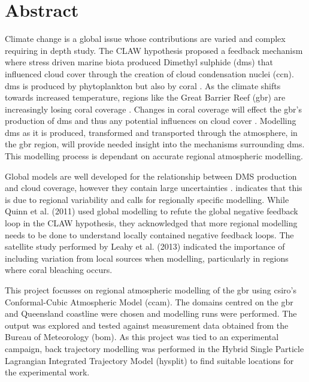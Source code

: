 


\chapter*{Abstract}
\label{ch:abst}

Climate change is a global issue whose contributions are varied and complex requiring in depth study. The CLAW hypothesis \citep{charlson:1987fw} proposed a feedback mechanism where stress driven marine biota produced Dimethyl sulphide (\gls{dms}) that influenced cloud cover through the creation of cloud condensation nuclei (\gls{ccn}). \gls{dms} is produced by phytoplankton but also by coral \citep{raina:2013fj}. As the climate shifts towards increased temperature, regions like the Great Barrier Reef (\gls{gbr}) are increasingly losing coral coverage \citep{hoeghguldberg:1999bi}. Changes in coral coverage will effect the \gls{gbr}'s production of \gls{dms} and thus any potential influences on cloud cover \citep{fischer2012atmospheric}. Modelling \gls{dms} as it is produced, transformed and transported through the atmosphere, in the \gls{gbr} region, will provide needed insight into the mechanisms surrounding \gls{dms}. This modelling process is dependant on accurate regional atmospheric modelling.

Global models are well developed for the relationship between DMS production and cloud coverage, however they contain large uncertainties \citep{woodhouse:2010ed}. \citep{cainey:2007jj} indicates that this is due to regional variability and calls for regionally specific modelling. While Quinn et al. (2011) used global modelling to refute the global negative feedback loop in the CLAW hypothesis, they acknowledged that more regional modelling needs to be done to understand locally contained negative feedback loops. The satellite study performed by Leahy et al. (2013) indicated the importance of including variation from local sources when modelling, particularly in regions where coral bleaching occurs.

This project focusses on regional atmospheric modelling of the \gls{gbr} using \gls{csiro}'s Conformal-Cubic Atmospheric Model (\gls{ccam}). The domains centred on the \gls{gbr} and Queensland coastline were chosen and modelling runs were performed. The output was explored and tested against measurement data obtained from the Bureau of Meteorology (\gls{bom}). As this project was tied to an experimental campaign, back trajectory modelling was performed in the Hybrid Single Particle Lagrangian Integrated Trajectory Model (\gls{hysplit}) to find suitable locations for the experimental work.


